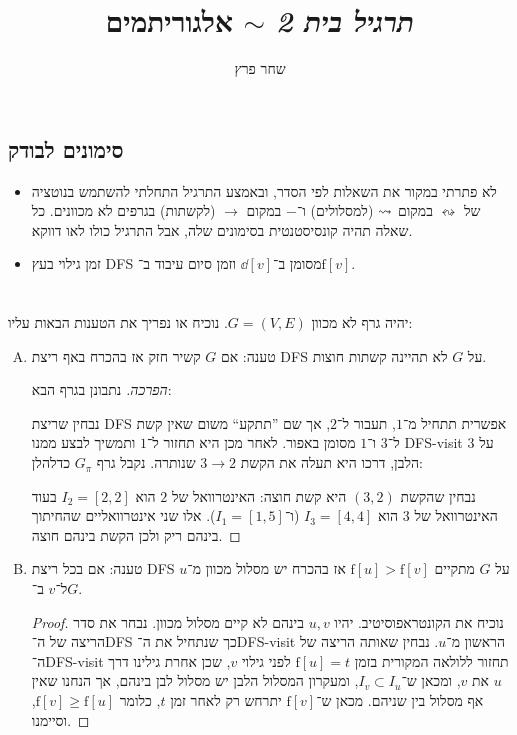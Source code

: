 \documentclass[]{../../../../tex/classes/homework}
\author{שחר פרץ}
\title{\textit{תרגיל בית 2} $\sim$ אלגוריתמים}
\newcommand\ff{\mathrm{f}}
\newcommand\squigd{\leftrightsquigarrow}
\begin{document}
	\maketitle
	\subsection*{סימונים לבודק}
	\begin{itemize}
		\item לא פתרתי במקור את השאלות לפי הסדר, ובאמצע התרגיל התחלתי להשתמש בנוטציה של $\squigd$ במקום $\rightsquigarrow$ (למסלולים) ו־$-$ במקום $\to$ (לקשתות) בגרפים לא מכוונים. כל שאלה תהיה קונסיסטנטית בסימונים שלה, אבל התרגיל כולו לאו דווקא. 
		\item זמן גילוי בעץ DFS מסומן ב־$\dd[v]$ וזמן סיום עיבוד ב־$\ff[v]$. 
	\end{itemize}
	
	\section{}
	יהיה גרף לא מכוון $G = (V, E)$. נוכיח או נפריך את הטענות הבאות עליו: 
	\begin{enumerate}[(A)]
		\item טענה: אם $G$ קשיר חזק אז בהכרח באף ריצת DFS על $G$ לא תהיינה קשתות חוצות. \begin{proof}[הפרכה]
			נתבונן בגרף הבא: 
			\begin{center}
				\sen{}\she
			\end{center}
			
			נבחין שריצת DFS אפשרית תתחיל מ־$1$, תעבור ל־$2$, אך שם ''תתקע`` משום שאין קשת ל־$3$ ו־$1$ מסומן באפור. לאחר מכן היא תחזור ל־$1$ ותמשיך לבצע ממנו DFS-visit על $3$ הלבן, דרכו היא תעלה את הקשת $3 \to 2$ שנותרה. נקבל גרף $G_\pi$ כדלהלן: 
			\begin{center}
				\sen{}\she
			\end{center}
			נבחין שהקשת $(3, 2)$ היא קשת חוצה: האינטרוואל של $2$ הוא $I_2 = [2, 2]$ בעוד האינטרוואל של $3$ הוא $I_3 = [4, 4]$ (ו־$I_1 = [1, 5]$). אלו שני אינטרוואליים שהחיתוך בינהם ריק ולכן הקשת בינהם חוצה. 
		\end{proof}
		\item טענה: אם בכל ריצת DFS על $G$ מתקיים $\ff[u] > \ff[v]$ אז בהכרח יש מסלול מכוון מ־$u$ ל־$v$ ב־$G$. \begin{proof}
			נוכיח את הקונטראפוסיטיב. יהיו $u, v$ בינהם לא קיים מסלול מכוון. נבחר את סדר הריצה של ה־DFS כך שנתחיל את ה־DFS-visit הראשון מ־$u$. נבחין שאותה הריצה של ה־DFS-visit תחזור ללולאה המקורית בזמן $\ff[u] = t$ לפני גילוי $v$, שכן אחרת גילינו דרך $u$ את $v$, ומכאן ש־$I_v \subset I_u$, ומעקרון המסלול הלבן יש מסלול לבן בינהם, אך הנחנו שאין אף מסלול בין שניהם. מכאן ש־$\ff[v]$ יתרחש רק לאחר זמן $t$, כלומר $\ff[v] \ge \ff[u]$, וסיימנו. 
		\end{proof}
	\end{enumerate}
	
\end{document}
